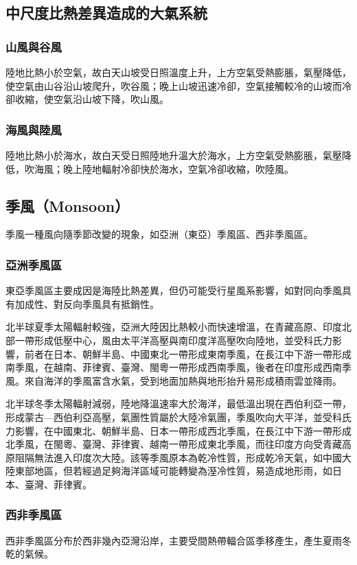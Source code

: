 \documentclass[a4paper,12pt]{report}
\begin{document}
\begin{itemize}
\subsection{中尺度比熱差異造成的大氣系統}
\subsubsection{山風與谷風}
陸地比熱小於空氣，故白天山坡受日照溫度上升，上方空氣受熱膨脹，氣壓降低，使空氣由山谷沿山坡爬升，吹谷風；晚上山坡迅速冷卻，空氣接觸較冷的山坡而冷卻收縮，使空氣沿山坡下降，吹山風。
\subsubsection{海風與陸風}
陸地比熱小於海水，故白天受日照陸地升溫大於海水，上方空氣受熱膨脹，氣壓降低，吹海風；晚上陸地輻射冷卻快於海水，空氣冷卻收縮，吹陸風。
\subsection{季風（Monsoon）}
季風一種風向隨季節改變的現象，如亞洲（東亞）季風區、西非季風區。
\subsubsection{亞洲季風區}
東亞季風區主要成因是海陸比熱差異，但仍可能受行星風系影響，如對同向季風具有加成性、對反向季風具有抵銷性。

北半球夏季太陽輻射較強，亞洲大陸因比熱較小而快速增溫，在青藏高原、印度北部一帶形成低壓中心，風由太平洋高壓與南印度洋高壓吹向陸地，並受科氏力影響，前者在日本、朝鮮半島、中國東北一帶形成東南季風，在長江中下游一帶形成南季風，在越南、菲律賓、臺灣、閩粵一帶形成西南季風，後者在印度形成西南季風。來自海洋的季風富含水氣，受到地面加熱與地形抬升易形成積雨雲並降雨。

北半球冬季太陽輻射減弱，陸地降溫速率大於海洋，最低溫出現在西伯利亞一帶，形成蒙古—西伯利亞高壓，氣團性質屬於大陸冷氣團，季風吹向大平洋，並受科氏力影響，在中國東北、朝鮮半島、日本一帶形成西北季風，在長江中下游一帶形成北季風，在閩粵、臺灣、菲律賓、越南一帶形成東北季風，而往印度方向受青藏高原阻隔無法進入印度次大陸。該等季風原本為乾冷性質，形成乾冷天氣，如中國大陸東部地區，但若經過足夠海洋區域可能轉變為溼冷性質，易造成地形雨，如日本、臺灣、菲律賓。
\subsubsection{西非季風區}
西非季風區分布於西非幾內亞灣沿岸，主要受間熱帶輻合區季移產生，產生夏雨冬乾的氣候。


\end{itemize}
\end{document}
